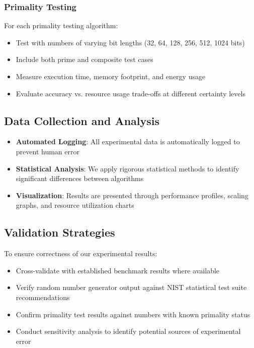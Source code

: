 \subsubsection{Primality Testing}
For each primality testing algorithm:
\begin{itemize}
    \item Test with numbers of varying bit lengths (32, 64, 128, 256, 512, 1024 bits)
    \item Include both prime and composite test cases
    \item Measure execution time, memory footprint, and energy usage
    \item Evaluate accuracy vs. resource usage trade-offs at different certainty levels
\end{itemize}

\subsection{Data Collection and Analysis}
\begin{itemize}
    \item \textbf{Automated Logging}: All experimental data is automatically logged to prevent human error
    \item \textbf{Statistical Analysis}: We apply rigorous statistical methods to identify significant differences between algorithms
    \item \textbf{Visualization}: Results are presented through performance profiles, scaling graphs, and resource utilization charts
\end{itemize}

\subsection{Validation Strategies}
To ensure correctness of our experimental results:
\begin{itemize}
    \item Cross-validate with established benchmark results where available
    \item Verify random number generator output against NIST statistical test suite recommendations \cite{nist_test_suite}
    \item Confirm primality test results against numbers with known primality status
    \item Conduct sensitivity analysis to identify potential sources of experimental error
\end{itemize}

